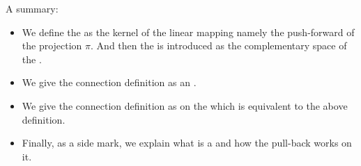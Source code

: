\documentclass{article}
\begin{document}
A summary:
\begin{itemize}[$\blacktriangleright$]
\item We define the  as the kernel of the linear mapping namely the push-forward of the projection $\pi$. And then the  is introduced as the complementary space of the .
\item We give the connection definition as an .
\item We give the connection definition as  on the  which is equivalent to the above definition.
\item Finally, as a side mark, we explain what is a  and how the pull-back works on it.
\end{itemize}
\end{document}
